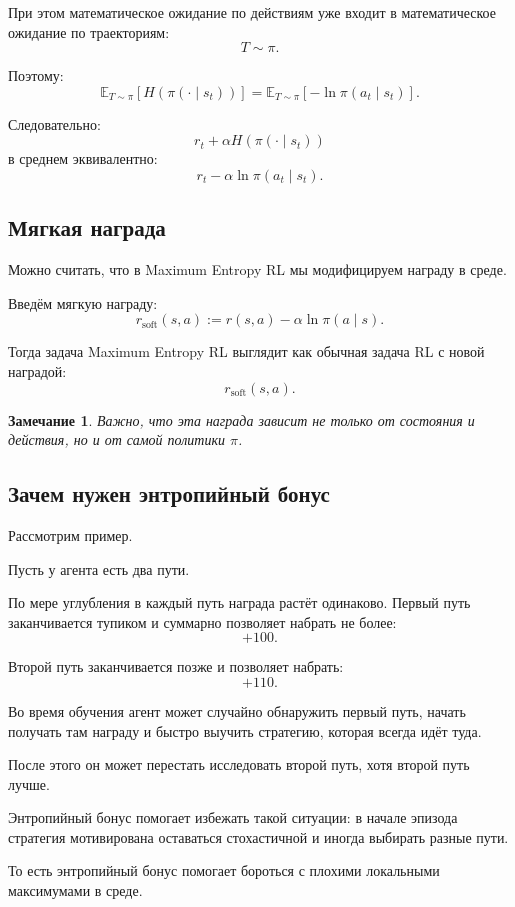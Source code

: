 \documentclass[12pt,a4paper]{article}
\newtheorem{remark}{Замечание}
\begin{document}
При этом математическое ожидание по действиям уже входит в математическое ожидание по траекториям:
\[
T\sim\pi.
\]

Поэтому:
\[
\mathbb E_{T\sim\pi}
\left[
H(\pi(\cdot\mid s_t))
\right]
=
\mathbb E_{T\sim\pi}
\left[
-\ln \pi(a_t\mid s_t)
\right].
\]

Следовательно:
\[
r_t+\alpha H(\pi(\cdot\mid s_t))
\]
в среднем эквивалентно:
\[
r_t-\alpha\ln\pi(a_t\mid s_t).
\]

\subsection{Мягкая награда}

Можно считать, что в Maximum Entropy RL мы модифицируем награду в среде.

Введём мягкую награду:
\[
r_{\mathrm{soft}}(s,a)
:=
r(s,a)
-
\alpha \ln \pi(a\mid s).
\]

Тогда задача Maximum Entropy RL выглядит как обычная задача RL с новой наградой:
\[
r_{\mathrm{soft}}(s,a).
\]

\begin{remark}
Важно, что эта награда зависит не только от состояния и действия, но и от самой политики $\pi$.
\end{remark}

\subsection{Зачем нужен энтропийный бонус}

Рассмотрим пример.

Пусть у агента есть два пути.

По мере углубления в каждый путь награда растёт одинаково. Первый путь заканчивается тупиком и суммарно позволяет набрать не более:
\[
+100.
\]

Второй путь заканчивается позже и позволяет набрать:
\[
+110.
\]

Во время обучения агент может случайно обнаружить первый путь, начать получать там награду и быстро выучить стратегию, которая всегда идёт туда.

После этого он может перестать исследовать второй путь, хотя второй путь лучше.

Энтропийный бонус помогает избежать такой ситуации: в начале эпизода стратегия мотивирована оставаться стохастичной и иногда выбирать разные пути.

То есть энтропийный бонус помогает бороться с плохими локальными максимумами в среде.
\end{document}
